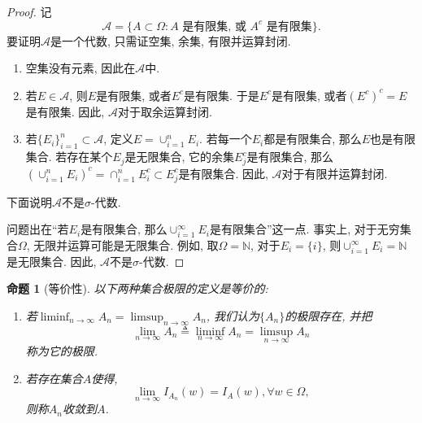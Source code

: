\documentclass[UTF8, a4paper]{article}
\newtheorem*{proposition}{命题}
\begin{document}
\begin{proof}
记
$$
\mathcal{A} = \{A \subset \Omega: A \text{ 是有限集, 或 } A^c \text{ 是有限集}\}.
$$
要证明\(\mathcal{A}\)是一个代数, 只需证空集, 余集, 有限并运算封闭.
\begin{enumerate}
    \item 空集没有元素, 因此在\(\mathcal{A}\)中.
    \item 若\(E \in \mathcal{A}\), 则\(E\)是有限集, 或者\(E^c\)是有限集. 于是\(E^c\)是有限集, 或者\((E^c)^c = E\)是有限集. 因此, \(\mathcal{A}\)对于取余运算封闭.
    \item 若\(\{E_i\}_{i=1}^n \subset \mathcal{A}\), 定义\(E = \cup_{i=1}^n E_i\). 若每一个\(E_i\)都是有限集合, 那么\(E\)也是有限集合. 若存在某个\(E_j\)是无限集合, 它的余集\(E_j^c\)是有限集合, 那么\(\left(\cup_{i=1}^n E_i\right)^c = \cap_{i=1}^n E_i^c \subset E_j^c\)是有限集合. 因此, \(\mathcal{A}\)对于有限并运算封闭. 
\end{enumerate}

下面说明\(\mathcal{A}\)不是\(\sigma\)-代数.

问题出在``若\(E_i\)是有限集合, 那么\(\cup_{i=1}^\infty E_i\)是有限集合''这一点. 事实上, 对于无穷集合\(\Omega\), 无限并运算可能是无限集合. 例如, 取\(\Omega = \mathbb{N}\), 对于\(E_i = \{i\}\), 则\(\cup_{i=1}^\infty E_i = \mathbb{N}\)是无限集合. 因此, \(\mathcal{A}\)不是\(\sigma\)-代数.

\end{proof}

\begin{framed}
\begin{proposition}[等价性]
以下两种集合极限的定义是等价的:
\begin{enumerate}
    \item 若\(\liminf_{n\rightarrow \infty} A_n = \limsup_{n\rightarrow \infty} A_n\), 我们认为\(\{A_n\}\)的极限存在, 并把$$\lim_{n\rightarrow \infty} A_n \triangleq \liminf_{n\rightarrow \infty} A_n = \limsup_{n\rightarrow \infty} A_n$$称为它的极限.
    \item 若存在集合\(A\)使得, $$\lim_{n\to \infty} I_{A_n}(w) = I_A(w), \forall w \in \Omega, $$则称\(A_n\)收敛到\(A\).
\end{enumerate}
\end{proposition}
\end{framed}
\end{document}
